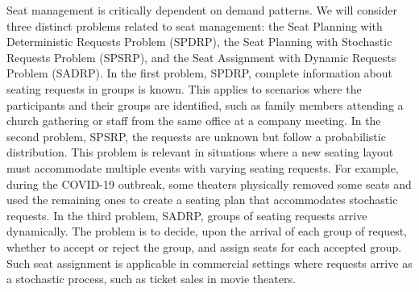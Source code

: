 Seat management is critically dependent on demand patterns. We will consider three distinct problems related to seat management: the Seat Planning with Deterministic Requests Problem (SPDRP), the Seat Planning with Stochastic Requests Problem (SPSRP), and the Seat Assignment with Dynamic Requests Problem (SADRP). In the first problem, SPDRP, complete information about seating requests in groups is known. This applies to scenarios where the participants and their groups are identified, such as family members attending a church gathering or staff from the same office at a company meeting. In the second problem, SPSRP, the requests are unknown but follow a probabilistic distribution. This problem is relevant in situations where a new seating layout must accommodate multiple events with varying seating requests. For example, during the COVID-19 outbreak, some theaters physically removed some seats and used the remaining ones to create a seating plan that accommodates stochastic requests. In the third problem, SADRP, groups of seating requests arrive dynamically. The problem is to decide, upon the arrival of each group of request, whether to accept or reject the group, and assign seats for each accepted group. Such seat assignment is applicable in commercial settings where requests arrive as a stochastic process, such as ticket sales in movie theaters.



 

